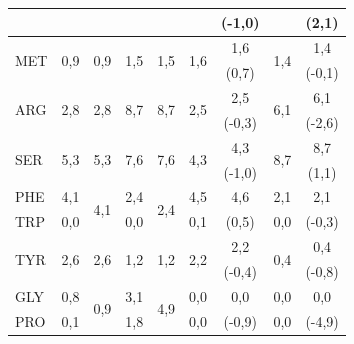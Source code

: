 \begin{table}
\begin{tabular}{lcccc|cccc}
&&&&&&(-1,0)&&(2,1)\\
\hline                                                                        
\multirow{2}{*}{MET}&\multirow{2}{*}{0,9}&\multirow{2}{*}{0,9}&\multirow{2}{*}{1,5}&\multirow{2}{*}{1,5}&\multirow{2}{*}{1,6}&1,6&\multirow{2}{*}{1,4}&1,4\\
&&&&&&(0,7)&&(-0,1)\\
\hline                                                                         
\multirow{2}{*}{ARG}&\multirow{2}{*}{2,8}&\multirow{2}{*}{2,8}&\multirow{2}{*}{8,7}&\multirow{2}{*}{8,7}&\multirow{2}{*}{2,5}&2,5&\multirow{2}{*}{6,1}&6,1\\
&&&&&&(-0,3)&&(-2,6)\\
\hline                                                                                  
\multirow{2}{*}{SER} &\multirow{2}{*}{5,3}&\multirow{2}{*}{5,3}&\multirow{2}{*}{7,6}&\multirow{2}{*}{7,6}&\multirow{2}{*}{4,3}&4,3&\multirow{2}{*}{8,7}&8,7\\
&&&&&&(-1,0)&&(1,1)\\
\hline                                                         
PHE      &4,1&\multirow{2}{*}{4,1}&2,4&\multirow{2}{*}{2,4}&4,5&\multirow{1}{*}{4,6}&2,1&\multirow{1}{*}{2,1}\\
TRP&0,0&&0,0&&0,1&(0,5)&0,0&(-0,3)\\
\hline                                                                                                                                                                                   
\multirow{2}{*}{TYR}&\multirow{2}{*}{2,6}&\multirow{2}{*}{2,6}&\multirow{2}{*}{1,2}&\multirow{2}{*}{1,2}&\multirow{2}{*}{2,2}&2,2&\multirow{2}{*}{0,4}&0,4\\
&&&&&&(-0,4)&&(-0,8)\\
\hline                                                                                                                                                                            
GLY&0,8&\multirow{2}{*}{0,9}&3,1&\multirow{2}{*}{4,9}&0,0&\multirow{1}{*}{0,0}&0,0&\multirow{1}{*}{0,0}\\
PRO&0,1&&1,8&&0,0&(-0,9)&0,0&(-4,9)\\
\hline
\end{tabular}
\label{Tab:FreqAA6}
\end{table}

